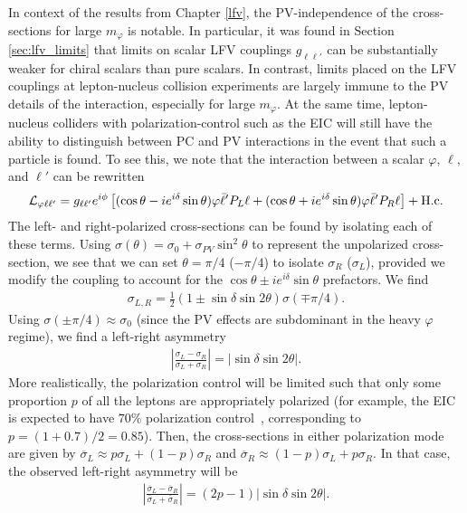 In context of the results from Chapter \ref{lfv}, the PV-independence of the cross-sections for large $m_\varphi$ is notable. In particular, it was found in Section \ref{sec:lfv_limits} that limits on scalar LFV couplings $g_{\ell\ell'}$ can be substantially weaker for chiral scalars than pure scalars. In contrast, limits placed on the LFV couplings at lepton-nucleus collision experiments are largely immune to the PV details of the interaction, especially for large $m_\varphi$. At the same time, lepton-nucleus colliders with polarization-control such as the EIC will still have the ability to distinguish between PC and PV interactions in the event that such a particle is found. To see this, we note that the interaction between a scalar $\varphi$, $\ell$, and $\ell'$ can be rewritten
\begin{align}
    {\cal L}_{\varphi \ell \ell'} = g_{\ell \ell'}e^{i\phi} \left[(\cos{\theta} - ie^{i\delta} \sin{\theta})\varphi\bar{\ell}'P_L\ell + (\cos{\theta} + ie^{i\delta} \sin{\theta})\varphi\bar{\ell}'P_R\ell\right] + {\rm H.c.}
\end{align}
The left- and right-polarized cross-sections can be found by isolating each of these terms. Using $\sigma(\theta) = \sigma_0 + \sigma_{PV}\sin^2{\theta}$ to represent the unpolarized cross-section, we see that we can set $\theta = \pi/4$ ($-\pi/4$) to isolate $\sigma_R$ ($\sigma_L$), provided we modify the coupling to account for the $\cos{\theta}\pm ie^{i\delta}\sin{\theta}$ prefactors. We find
\begin{align}
    \sigma_{L,R} = \frac{1}{2}(1 \pm \sin{\delta}\sin{2\theta})\sigma(\mp \pi/4).
\end{align}
Using $\sigma(\pm \pi/4) \approx \sigma_0$ (since the PV effects are subdominant in the heavy $\varphi$ regime), we find a left-right asymmetry
\begin{align}
    \left|\frac{\sigma_L - \sigma_R}{\sigma_L + \sigma_R}\right| = \left|\sin{\delta}\sin{2\theta}\right|.
\end{align}
More realistically, the polarization control will be limited such that only some proportion $p$ of all the leptons are appropriately polarized (for example, the EIC is expected to have $70\%$ polarization control~\cite{AbdulKhalek:2021gbh}, corresponding to $p = (1+0.7)/2 = 0.85$). Then, the cross-sections in either polarization mode are given by $\overline{\sigma}_L \approx p\sigma_L + (1-p)\sigma_R$ and $\overline{\sigma}_R \approx (1-p)\sigma_L + p\sigma_R$. In that case, the observed left-right asymmetry will be
\begin{align}
    \left|\frac{\overline{\sigma}_L - \overline{\sigma}_R}{\overline{\sigma}_L + \overline{\sigma}_R}\right| = (2p - 1)\left|\sin{\delta}\sin{2\theta}\right|.
\end{align}


